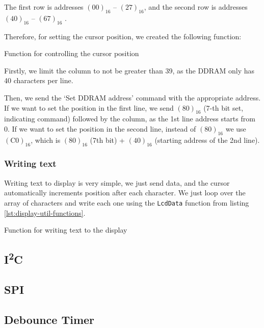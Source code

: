 \documentclass[10pt]{article}
\newcommand{\code}[3]{}
\begin{document}
    The first row is addresses $(00)_{16}$ -- $(27)_{16}$, and the second row is addresses $(40)_{16}$ -- $(67)_{16}$ \cite[p.11]{display-man}.

    Therefore, for setting the cursor position, we created the following function:
    \begin{program}[H]
        \code{108}{116}{display.h}
        \caption{Function for controlling the cursor position}
    \end{program}

    Firstly, we limit the column to not be greater than 39, as the DDRAM only has 40 characters per line.

    Then, we send the `Set DDRAM address' command with the appropriate address.
    If we want to set the position in the first line, we send $(80)_{16}$ (7-th bit set, indicating command) followed by the column, as the 1st line address starts from 0.
    If we want to set the position in the second line, instead of $(80)_{16}$ we use $(\mathrm{C0})_{16}$, which is $(80)_{16}$ (7th bit) + $(40)_{16}$ (starting address of the 2nd line).

    \subsubsection{Writing text}

    Writing text to display is very simple, we just send data, and the cursor automatically increments position after each character.
    We just loop over the array of characters and write each one using the \texttt{LcdData} function from listing \ref{lst:display-util-functions}.

    \begin{program}[H]
        \code{118}{124}{display.h}
        \caption{Function for writing text to the display}
    \end{program}

    \subsection{I\textsuperscript{2}C}

    \subsection{SPI}

    \subsection{Debounce Timer}
    
\end{document}
